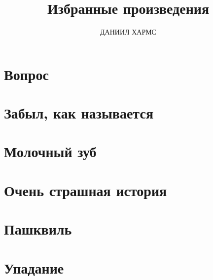 \documentclass[12pt]{article}
\title{Избранные произведения}
\author{ДАНИИЛ ХАРМС}
\date{}
\begin{document}
\setlength{\parindent}{1.5cm}
\maketitle
\vspace*{-\baselineskip}

\section*{\centering Вопрос}


\section*{\centering Забыл, как называется}


\section*{\centering Молочный зуб}


\section*{\centering Очень страшная история}


\section*{\centering Пашквиль}


\section*{\centering Упадание}

\end{document}
